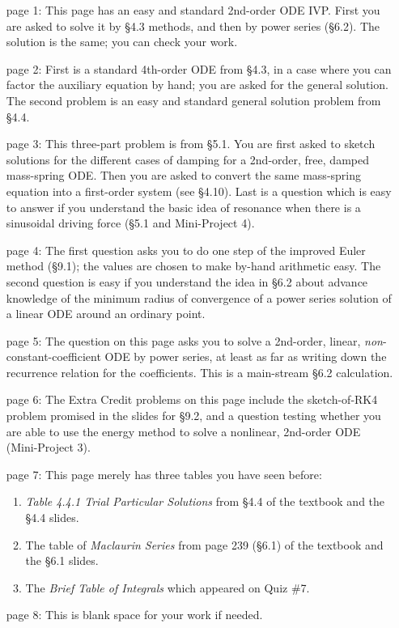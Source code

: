 \documentclass[12pt]{article}
\begin{document}
\begin{itemize}
\item[page 1:]  This page has an easy and standard 2nd-order ODE IVP.  First you are asked to solve it by \S4.3 methods, and then by power series (\S6.2).  The solution is the same; you can check your work.
\item[page 2:]  First is a standard 4th-order ODE from \S4.3, in a case where you can factor the auxiliary equation by hand; you are asked for the general solution.  The second problem is an easy and standard general solution problem from \S4.4.
\item[page 3:]  This three-part problem is from \S5.1.  You are first asked to sketch solutions for the different cases of damping for a 2nd-order, free, damped mass-spring ODE.  Then you are asked to convert the same mass-spring equation into a first-order system (see \S4.10).  Last is a question which is easy to answer if you understand the basic idea of resonance when there is a sinusoidal driving force (\S5.1 and Mini-Project 4).
\item[page 4:]  The first question asks you to do one step of the improved Euler method (\S9.1); the values are chosen to make by-hand arithmetic easy.  The second question is easy if you understand the idea in \S6.2 about advance knowledge of the minimum radius of convergence of a power series solution of a linear ODE around an ordinary point.
\item[page 5:]  The question on this page asks you to solve a 2nd-order, linear, \emph{non}-constant-coefficient ODE by power series, at least as far as writing down the recurrence relation for the coefficients.  This is a main-stream \S6.2 calculation.
\item[page 6:]  The Extra Credit problems on this page include the sketch-of-RK4 problem promised in the slides for \S9.2, and a question testing whether you are able to use the energy method to solve a nonlinear, 2nd-order ODE (Mini-Project 3).
\item[page 7:]  This page merely has three tables you have seen before:
    \begin{enumerate}
    \item \emph{Table 4.4.1 Trial Particular Solutions} from \S4.4 of the textbook and the \S4.4 slides.
    \item The table of \emph{Maclaurin Series} from page 239 (\S6.1) of the textbook and the \S6.1 slides.
    \item The \emph{Brief Table of Integrals} which appeared on Quiz \#7.
    \end{enumerate}
\item[page 8:]  This is blank space for your work if needed.
\end{itemize}
\end{document}
